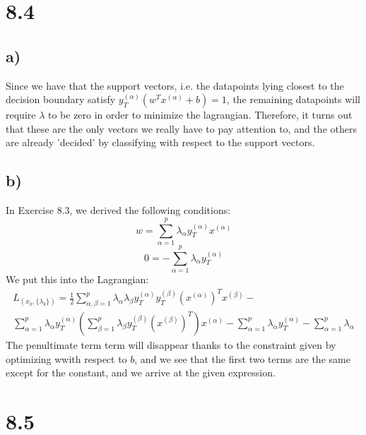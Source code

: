 \documentclass[11pt,a4paper]{article}
\begin{document}
\section*{8.4}
\subsection{a)}
Since we have that the support vectors, i.e. the datapoints lying closest to the decision boundary satisfy $y_T^{(\alpha)}(w^Tx^{(\alpha)}+b) = 1$, the remaining datapoints will require $\lambda$ to be zero in order to minimize the lagrangian. Therefore, it turns out that these are the only vectors we really have to pay attention to, and the others are already 'decided' by classifying with respect to the support vectors.
\subsection{b)}
In Exercise 8.3, we derived the following conditions:
\begin{equation}
w = \sum_{\alpha=1}^p \lambda_\alpha y_T^{(\alpha)}x^{(\alpha)}
\end{equation}
\begin{equation}
0 = - \sum_{\alpha=1}^p \lambda_\alpha y_T^{(\alpha)}
\end{equation}
We put this into the Lagrangian:
\begin{equation}
\begin{split}
L_{(x_k, \{\lambda_k\})} =  \frac{1}{2} \sum _{\alpha, \beta=1}^p\lambda_\alpha \lambda_\beta y_T^{(\alpha)}y_T^{(\beta)}(x^{(\alpha)})^Tx^{(\beta)}-
\\\sum _{\alpha=1}^p\lambda_\alpha y_T^{(\alpha)} \left (\sum_{\beta=1}^p \lambda_\beta y_T^{(\beta)}(x^{(\beta)})^T \right ) x^{(\alpha)}  -\sum_{\alpha=1}^p\lambda_\alpha y_T^{(\alpha)}- \sum_{\alpha=1}^p\lambda_\alpha
\end{split}
\end{equation}
The penultimate term term will disappear thanks to the constraint given by optimizing wwith respect to $b$, and we see that the first two terms are the same except for the constant, and we arrive at the given expression.
\section*{8.5}
\end{document}
